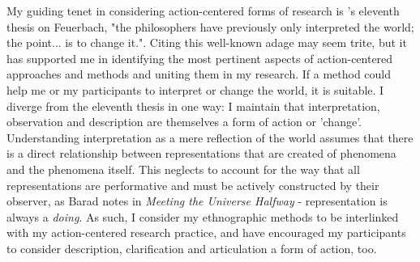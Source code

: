 My guiding tenet in considering action-centered forms of research is \citet[173]{marx_selected_2000}'s eleventh thesis on Feuerbach, "the philosophers have previously only interpreted the world; the point... is to change it.". Citing this well-known adage may seem trite, but it has supported me in identifying the most pertinent aspects of action-centered approaches and methods and uniting them in my research. If a method could help me or my participants to interpret or change the world, it is suitable. I diverge from the eleventh thesis in one way: I maintain that interpretation, observation and description are themselves a form of action or 'change'. Understanding interpretation as a mere reflection of the world assumes that there is a direct relationship between representations that are created of phenomena and the phenomena itself. This neglects to account for the way that all representations are performative and must be actively constructed by their observer, as Barad notes in \textit{Meeting the Universe Halfway} \citep{barad_meeting_2007} - representation is always a \textit{doing}. As such, I consider my ethnographic methods to be interlinked with my action-centered research practice, and have encouraged my participants to consider description, clarification and articulation a form of action, too.

